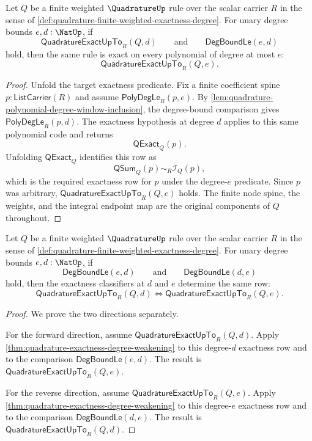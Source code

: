 \begin{theorem}
\label{thm:quadrature-exactness-degree-weakening}
Let $Q$ be a finite weighted $\QuadratureUp$ rule over the scalar carrier $R$ in the sense of \autoref{def:quadrature-finite-weighted-exactness-degree}. For unary degree bounds $e,d:\NatUp$, if
$$
\mathsf{QuadratureExactUpTo}_R(Q,d)
\qquad\text{and}\qquad
\mathsf{DegBoundLe}(e,d)
$$
hold, then the same rule is exact on every polynomial of degree at most $e$:
$$
\mathsf{QuadratureExactUpTo}_R(Q,e).
$$
\end{theorem}
\begin{proof}
Unfold the target exactness predicate. Fix a finite coefficient spine $p:\mathsf{ListCarrier}(R)$ and assume $\mathsf{PolyDegLe}_R(p,e)$. By \autoref{lem:quadrature-polynomial-degree-window-inclusion}, the degree-bound comparison gives $\mathsf{PolyDegLe}_R(p,d)$. The exactness hypothesis at degree $d$ applies to this same polynomial code and returns
$$
\mathsf{QExact}_Q(p).
$$
Unfolding $\mathsf{QExact}_Q$ identifies this row as
$$
\mathsf{QSum}_Q(p)\sim_R\mathcal I_Q(p),
$$
which is the required exactness row for $p$ under the degree-$e$ predicate. Since $p$ was arbitrary, $\mathsf{QuadratureExactUpTo}_R(Q,e)$ holds. The finite node spine, the weights, and the integral endpoint map are the original components of $Q$ throughout.
\end{proof}

\begin{theorem}
\label{thm:quadrature-exactness-degree-equivalence-stability}
Let $Q$ be a finite weighted $\QuadratureUp$ rule over the scalar carrier $R$ in the sense of \autoref{def:quadrature-finite-weighted-exactness-degree}. For unary degree bounds $e,d:\NatUp$, if
$$
\mathsf{DegBoundLe}(e,d)
\qquad\text{and}\qquad
\mathsf{DegBoundLe}(d,e)
$$
hold, then the exactness classifiers at $d$ and $e$ determine the same row:
$$
\mathsf{QuadratureExactUpTo}_R(Q,d)
\Longleftrightarrow
\mathsf{QuadratureExactUpTo}_R(Q,e).
$$
\end{theorem}
\begin{proof}
We prove the two directions separately.

For the forward direction, assume $\mathsf{QuadratureExactUpTo}_R(Q,d)$. Apply \autoref{thm:quadrature-exactness-degree-weakening} to this degree-$d$ exactness row and to the comparison $\mathsf{DegBoundLe}(e,d)$. The result is $\mathsf{QuadratureExactUpTo}_R(Q,e)$.

For the reverse direction, assume $\mathsf{QuadratureExactUpTo}_R(Q,e)$. Apply \autoref{thm:quadrature-exactness-degree-weakening} to this degree-$e$ exactness row and to the comparison $\mathsf{DegBoundLe}(d,e)$. The result is $\mathsf{QuadratureExactUpTo}_R(Q,d)$.
\end{proof}


